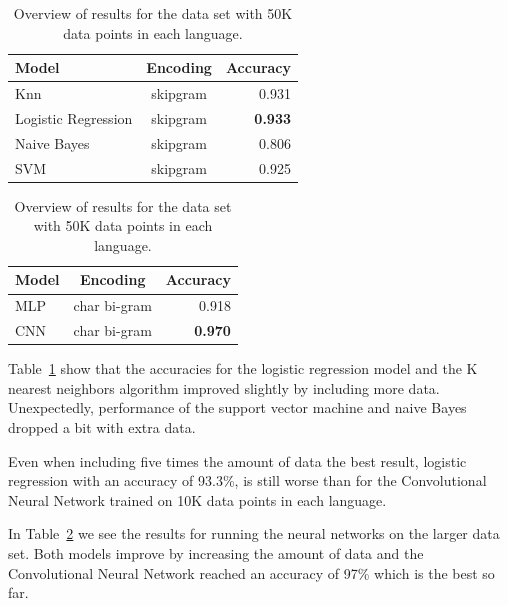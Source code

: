 \begin{table}
  \centering
  \begin{tabular}{ l  c | r }
    \hline
    Model               & Encoding & Accuracy \\
    \hline
    Knn                 & skipgram & 0.931\\
    Logistic Regression & skipgram  & \textbf{0.933}\\
    Naive Bayes         & skipgram  & 0.806\\
    SVM                 & skipgram& 0.925\\
    \hline
  \end{tabular}
  \caption{Overview of results for the data set with 50K data points in each language.}
  \label{results-sklearn300k}
\end{table}


\begin{table}
  \centering
  \begin{tabular}{ l c | r }
    \hline
    Model               & Encoding & Accuracy \\
    \hline
    MLP                 & char bi-gram  & 0.918\\
    CNN                 & char bi-gram  & \textbf{0.970}\\
    \hline
  \end{tabular}
  \caption{Overview of results for the data set with 50K data points in each language.}
  \label{results-keras-300k}
\end{table}

Table~\ref{results-sklearn300k} show that the accuracies for the logistic regression model and the K nearest neighbors algorithm improved slightly by including more data. Unexpectedly, performance of the support vector machine and naive Bayes dropped a bit with extra data.

Even when including five times the amount of data the best result, logistic regression with an accuracy of 93.3\%, is still worse than for the Convolutional Neural Network trained on 10K data points in each language.

In Table~\ref{results-keras-300k} we see the results for running the neural networks on the larger data set. Both models improve by increasing the amount of data and the Convolutional Neural Network reached an accuracy of 97\% which is the best so far.


